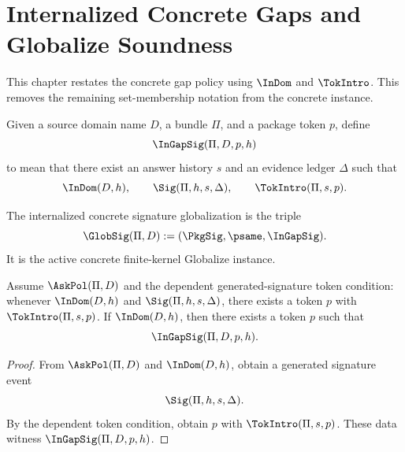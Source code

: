 \chapter{Internalized Concrete Gaps and Globalize Soundness}
\label{sec:concrete-hardening-gap-globalize}

This chapter restates the concrete gap policy using \(\InDom\) and \(\TokIntro\). This removes the remaining set-membership notation from the concrete instance.

\begin{definition}
\label{def:internalized-signature-gap}
Given a source domain name \(D\), a bundle \(\Pi\), and a package token \(p\), define
$$
  \InGapSig(\Pi,D,p,h)
$$
to mean that there exist an answer history \(s\) and an evidence ledger \(\Delta\) such that
$$
  \InDom(D,h),
  \qquad
  \Sig(\Pi,h,s,\Delta),
  \qquad
  \TokIntro(\Pi,s,p).
$$
\end{definition}

\begin{definition}
\label{def:internalized-concrete-globalize-instance}
The internalized concrete signature globalization is the triple
$$
  \GlobSig(\Pi,D)
  :=
  (\PkgSig,\psame,\InGapSig).
$$
It is the active concrete finite-kernel Globalize instance.
\end{definition}

\begin{theorem}
\label{thm:gap-coverage-concrete}
Assume $\AskPol(\Pi,D)$ and the dependent generated-signature token condition: whenever $\InDom(D,h)$ and $\Sig(\Pi,h,s,\Delta)$, there exists a token $p$ with $\TokIntro(\Pi,s,p)$. If $\InDom(D,h)$, then there exists a token $p$ such that
$$
  \InGapSig(\Pi,D,p,h).
$$
\end{theorem}

\begin{proof}
From $\AskPol(\Pi,D)$ and $\InDom(D,h)$, obtain a generated signature event
$$
  \Sig(\Pi,h,s,\Delta).
$$
By the dependent token condition, obtain $p$ with $\TokIntro(\Pi,s,p)$. These data witness $\InGapSig(\Pi,D,p,h)$.
\end{proof}

